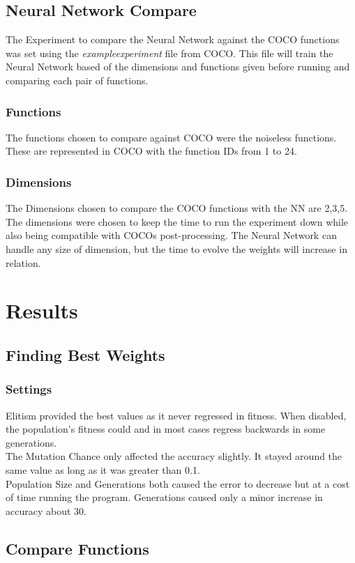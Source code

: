\documentclass[12pt]{article}
\begin{document}
\subsection{Neural Network Compare}
The Experiment to compare the Neural Network against the COCO functions was set using the \textit{exampleexperiment} file from COCO. This file will train the Neural Network based of the dimensions and functions given before running and comparing each pair of functions.

\subsubsection{Functions}
The functions chosen to compare against COCO were the noiseless functions. These are represented in COCO with the function IDs from 1 to 24.

\subsubsection{Dimensions}
The Dimensions chosen to compare the COCO functions with the NN are 2,3,5. The dimensions were chosen to keep the time to run the experiment down while also being compatible with COCOs post-processing. The Neural Network can handle any size of dimension, but the time to evolve the weights will increase in relation.


\newpage
\section{Results}
\subsection{Finding Best Weights}
\subsubsection{Settings}
Elitism provided the best values as it never regressed in fitness. When disabled, the population's fitness could and in most cases regress backwards in some generations.\\
The Mutation Chance only affected the accuracy slightly. It stayed around the same value as long as it was greater than 0.1. \\
Population Size and Generations both caused the error to decrease but at a cost of time running the program. Generations caused only a minor increase in accuracy about 30.

\subsection{Compare Functions}
\end{document}
